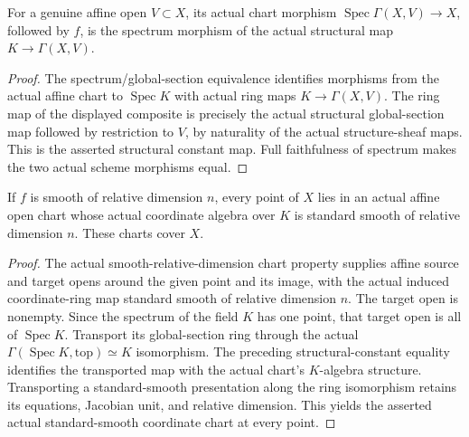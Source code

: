 \begin{theorem}
\label{sc0-canonical-port:geom:affine-chart-structural-constants}

\leanok
For a genuine affine open \(V\subset X\), its actual
chart morphism \(\operatorname{Spec}\Gamma(X,V)\to X\),
followed by \(f\), is the spectrum morphism of the actual
structural map \(K\to\Gamma(X,V)\).
\end{theorem}
\begin{proof}
The spectrum/global-section equivalence identifies morphisms
from the actual affine chart to \(\operatorname{Spec}K\)
with actual ring maps \(K\to\Gamma(X,V)\). The ring map
of the displayed composite is precisely the actual structural
global-section map followed by restriction to \(V\), by
naturality of the actual structure-sheaf maps. This is the
asserted structural constant map. Full faithfulness of spectrum
makes the two actual scheme morphisms equal.
\end{proof}

\begin{theorem}
\label{sc0-canonical-port:geom:smooth-scheme-standard-smooth-coordinate-cover}
\leanok
If \(f\) is smooth of relative dimension \(n\), every
point of \(X\) lies in an actual affine open chart whose
actual coordinate algebra over \(K\) is standard smooth
of relative dimension \(n\). These charts cover \(X\).
\end{theorem}
\begin{proof}
The actual smooth-relative-dimension chart property supplies
affine source and target opens around the given point and its
image, with the actual induced coordinate-ring map standard
smooth of relative dimension \(n\). The target open is
nonempty. Since the spectrum of the field \(K\) has one
point, that target open is all of \(\operatorname{Spec}K\).
Transport its global-section ring through the actual
\(\Gamma(\operatorname{Spec}K,\mathrm{top})\simeq K\)
isomorphism. The preceding structural-constant equality
identifies the transported map with the actual chart's
\(K\)-algebra structure. Transporting a standard-smooth
presentation along the ring isomorphism retains its equations,
Jacobian unit, and relative dimension. This yields the
asserted actual standard-smooth coordinate chart at every point.
\end{proof}

